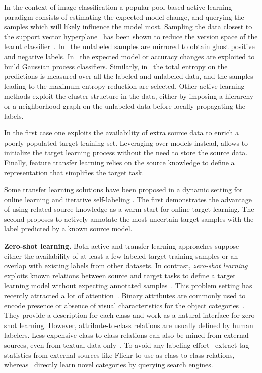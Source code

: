 \documentclass[10pt,twocolumn,letterpaper]{article}
\begin{document}
In the context of image classification a popular pool-based active learning paradigm consists of
estimating the expected model change, and querying the samples which will likely influence the model most. 
Sampling the data closest to the support vector hyperplane~\cite{Schohn, Vijayanarasimhan2011} has 
been shown to reduce the version space of the learnt classifier~\cite{Tong2002}. 
In~\cite{VijayanarasimhanJG10} the unlabeled samples are mirrored to obtain ghost positive and negative labels.
In~\cite{Freytag14, VezhnevetsBF12} the expected model or accuracy changes are exploited to build Gaussian process classifiers.
Similarly, in~\cite{KovashkaVG11} the total entropy on the predictions is measured over all the labeled and unlabeled data, and the samples leading to the maximum entropy reduction are selected.
Other active learning methods exploit the cluster structure in the data, either by imposing a hierarchy \cite{Dasgupta} or a neighborhood graph on the unlabeled data \cite{Zhu03combiningactive} before locally propagating the labels.

In the first case one exploits the availability of extra source data to enrich a poorly populated target training set.
Leveraging over models instead, allows to initialize the target learning process without the need to store the source data.
Finally, feature transfer learning relies on the source knowledge to define a representation that simplifies the target task.

Some transfer learning solutions have been proposed in a dynamic setting for online learning \cite{Tommasi_BMVC_2012}
and iterative self-labeling \cite{dasvm}. The first demonstrates the advantage of using related source knowledge
as a warm start for online target learning. The second proposes to actively annotate the most uncertain target samples with the label predicted by a known source model.

\textbf{Zero-shot learning.} Both active and transfer learning approaches suppose either the availability of at least a few labeled target training samples or an overlap with existing labels from other datasets. In contrast, \emph{zero-shot learning} exploits known relations between source and target tasks to define a target learning model without expecting annotated samples~\cite{lampert13pami,socher_NIPS2013}. This problem setting has recently attracted a lot of attention~\cite{lampert13pami, akata13cvpr, MensinkCVPR2014, devise, conse, LiECCV2014}.
Binary attributes are commonly used to encode presence or absence of visual characteristics for the object categories~\cite{lampert13pami, akata13cvpr}. They provide a description for each class and work as a natural interface for zero-shot learning. However, attribute-to-class relations are usually defined by human labelers.
Less expensive class-to-class relations can also be mined from external sources, even from textual data only~\cite{devise,conse,rohrbach10cvpr}. To avoid any labeling effort~\cite{MensinkCVPR2014} extract tag statistics from external sources like Flickr to use as class-to-class relations, whereas~\cite{Chen_2013_ICCV} directly learn novel categories by querying search engines.
\end{document}
